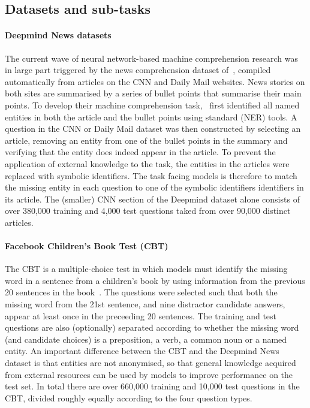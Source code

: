 \documentclass[11pt,letterpaper]{article}
\begin{document}
\subsection{Datasets and sub-tasks}
\paragraph{Deepmind News datasets} The current wave of neural network-based machine comprehension research was in large part triggered by the news comprehension dataset of~, compiled automatically from articles on the CNN and Daily Mail websites. News stories on both sites are summarised by a series of bullet points that summarise their main points. To develop their machine comprehension task,~\cite{hermann2015teaching} first identified all named entities in both the article and the bullet points using standard (NER) tools. A question in the CNN or Daily Mail dataset was then constructed by selecting an article, removing an entity from one of the bullet points in the summary and verifying that the entity does indeed appear in the article. To prevent the application of external knowledge to the task, the entities in the articles were replaced with symbolic identifiers. The task facing models is therefore to match the missing entity in each question to one of the symbolic identifiers identifiers in its article. The (smaller) CNN section of the Deepmind dataset alone consists of over 380,000 training and 4,000 test questions taked from over 90,000 distinct articles.

\paragraph{Facebook Children's Book Test (CBT)} The CBT is a multiple-choice test in which models must identify the missing word in a sentence from a children's book by using information from the previous 20 sentences in the book~. The questions were selected such that both the missing word from the 21st sentence, and nine distractor candidate answers, appear at least once in the preceeding 20 sentences. The training and test questions are also (optionally) separated according to whether the missing word (and candidate choices) is a preposition, a verb, a common noun or a named entity. An important difference between the CBT and the Deepmind News dataset is that entities are not anonymised, so that general knowledge acquired from external resources can be used by models to improve performance on the test set. In total there are over 660,000 training and 10,000 test questions in the CBT, divided roughly equally according to the four question types. 
\end{document}
